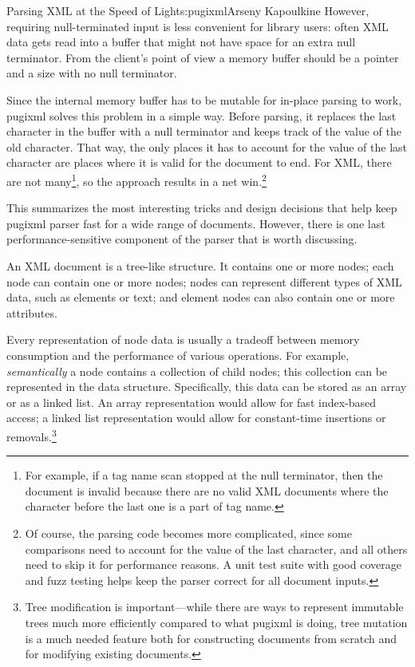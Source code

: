 \begin{aosachapter}{Parsing XML at the Speed of Light}{s:pugixml}{Arseny Kapoulkine}
However, requiring null-terminated input is less convenient for library
users: often XML data gets read into a buffer that might not have space
for an extra null terminator. From the client's point of view a memory
buffer should be a pointer and a size with no null terminator.

Since the internal memory buffer has to be mutable for in-place parsing
to work, pugixml solves this problem in a simple way. Before parsing, it
replaces the last character in the buffer with a null terminator and
keeps track of the value of the old character. That way, the only places
it has to account for the value of the last character are places where
it is valid for the document to end. For XML, there are not
many\footnote{For example, if a tag name scan stopped at the null
  terminator, then the document is invalid because there are no valid
  XML documents where the character before the last one is a part of tag
  name.}, so the approach results in a net win.\footnote{Of course, the
  parsing code becomes more complicated, since some comparisons need to
  account for the value of the last character, and all others need to
  skip it for performance reasons. A unit test suite with good coverage
  and fuzz testing helps keep the parser correct for all document
  inputs.}

This summarizes the most interesting tricks and design decisions that
help keep pugixml parser fast for a wide range of documents. However,
there is one last performance-sensitive component of the parser that is
worth discussing.


An XML document is a tree-like structure. It contains one or more nodes;
each node can contain one or more nodes; nodes can represent different
types of XML data, such as elements or text; and element nodes can also
contain one or more attributes.

Every representation of node data is usually a tradeoff between memory
consumption and the performance of various operations. For example,
\emph{semantically} a node contains a collection of child nodes; this
collection can be represented in the data structure. Specifically, this
data can be stored as an array or as a linked list. An array
representation would allow for fast index-based access; a linked list
representation would allow for constant-time insertions or
removals.\footnote{Tree modification is important---while there are ways
  to represent immutable trees much more efficiently compared to what
  pugixml is doing, tree mutation is a much needed feature both for
  constructing documents from scratch and for modifying existing
  documents.}


\end{aosachapter}
